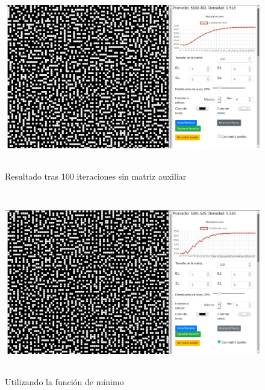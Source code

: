 \documentclass[12pt, titlepage]{article}
\begin{document}
\begin{figure}[H]
\begin{center}
 \includegraphics[width=15cm, height=8cm]{./img/3634.png}
 \caption{Resultado tras 100 iteraciones sin matriz auxiliar}
 \label{fig:3634}
\end{center}
\end{figure}

\begin{figure}[H]
\begin{center}
 \includegraphics[width=15cm, height=8cm]{./img/3634-min.png}
 \caption{Utilizando la función de mínimo}
 \label{fig:3634-min}
\end{center}
\end{figure}
\end{document}
